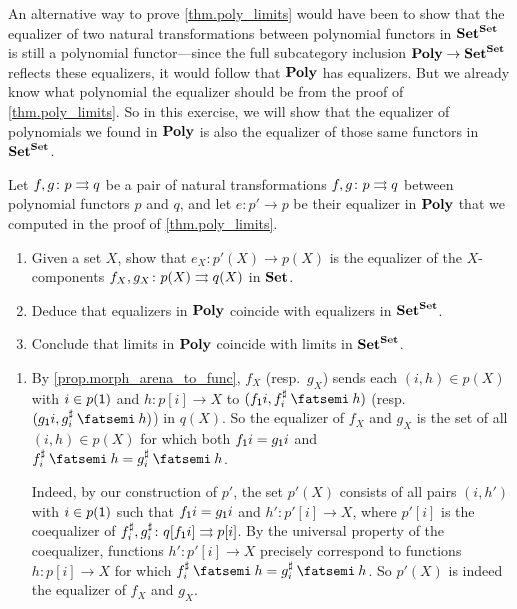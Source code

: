 \documentclass[Book-Poly]{subfiles}
\begin{document}
\begin{exercise} \label{exc.refl_limits}
An alternative way to prove \cref{thm.poly_limits} would have been to show that the equalizer of two natural transformations between polynomial functors in $\mathbf{Set}^{\mathbf{Set}}$ is still a polynomial functor---since the full subcategory inclusion $\mathbf{Poly} \to \mathbf{Set}^{\mathbf{Set}}$ reflects these equalizers, it would follow that $\mathbf{Poly}$ has equalizers.
But we already know what polynomial the equalizer should be from the proof of \cref{thm.poly_limits}.
So in this exercise, we will show that the equalizer of polynomials we found in $\mathbf{Poly}$ is also the equalizer of those same functors in $\mathbf{Set}^{\mathbf{Set}}$.

Let $f,g\colon p\rightrightarrows q$ be a pair of natural transformations $f,g\colon p\rightrightarrows q$ between polynomial functors $p$ and $q$, and let $e\colon p'\to p$ be their equalizer in $\mathbf{Poly}$ that we computed in the proof of \cref{thm.poly_limits}.
\begin{enumerate}
    \item Given a set $X$, show that $e_X\colon p'(X)\to p(X)$ is the equalizer of the $X$-components $f_X,g_X\colon p(X)\rightrightarrows q(X)$ in $\mathbf{Set}$.
    \item Deduce that equalizers in $\mathbf{Poly}$ coincide with equalizers in $\mathbf{Set}^{\mathbf{Set}}$.
    \item Conclude that limits in $\mathbf{Poly}$ coincide with limits in $\mathbf{Set}^{\mathbf{Set}}$. \qedhere
\end{enumerate}
\begin{solution}
\begin{enumerate}
    \item By \cref{prop.morph_arena_to_func}, $f_X$ (resp.\ $g_X$) sends each $(i,h)\in p(X)$ with $i\in p(\textsf{1})$ and $h\colon p[i]\to X$ to $(f_\1i, f^\sharp_i\then h)$ (resp.\ $(g_\1i, g^\sharp_i\then h)$) in $q(X)$.
    So the equalizer of $f_X$ and $g_X$ is the set of all $(i,h)\in p(X)$ for which both $f_{\textsf{1}}i = g_{\textsf{1}}i$ and $f^\sharp_i\then h = g^\sharp_i\then h$.

    Indeed, by our construction of $p'$, the set $p'(X)$ consists of all pairs $(i,h')$ with $i\in p(\textsf{1})$ such that $f_{\textsf{1}}i = g_{\textsf{1}}i$ and $h'\colon p'[i]\to X$, where $p'[i]$ is the coequalizer of $f^\sharp_i,g^\sharp_i\colon q[f_{\textsf{1}}i]\rightrightarrows p[i]$.
    By the universal property of the coequalizer, functions $h'\colon p'[i]\to X$ precisely correspond to functions $h\colon p[i]\to X$ for which $f^\sharp_i\then h = g^\sharp_i\then h$.
    So $p'(X)$ is indeed the equalizer of $f_X$ and $g_X$.


\end{enumerate}
\end{solution}
\end{exercise}
\end{document}
